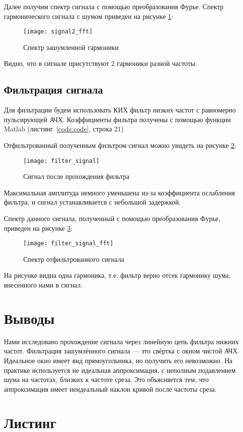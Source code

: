 Далее получим спектр сигнала с помощью преобразования Фурье. Спектр гармонического сигнала с шумом приведен на рисунке \ref{pic:signal2_fft}:
\begin{figure}[H]
	\begin{center}
		\texttt{[image: signal2\_fft]}
		\caption{Спектр зашумленной гармоники} 
		\label{pic:signal2_fft} %
	\end{center}
\end{figure}
Видно, что в сигнале присутствуют 2 гармоники разной частоты.

\subsection{Фильтрация сигнала}

Для фильтрации будем использовать КИХ фильтр низких частот с равномерно пульсирующей АЧХ. 
Коэффициенты фильтра получены с помощью функции Matlab (листинг~\ref{code:code}, строка 21)

Отфильтрованный полученным фильтром сигнал можно увидеть на рисунке \ref{pic:filter_signal}:
\begin{figure}[H]
	\begin{center}
		\texttt{[image: filter\_signal]}
		\caption{Сигнал после прохождения фильтра} 
		\label{pic:filter_signal} %
	\end{center}
\end{figure}
Максимальная амплитуда немного уменьшена из-за коэффициента ослабления фильтра, и сигнал устанавливается с небольшой задержкой.

Спектр данного сигнала, полученный с помощью преобразования Фурье, приведен на рисунке \ref{pic:filter_signal_fft}:
\begin{figure}[H]
	\begin{center}
		\texttt{[image: filter\_signal\_fft]}
		\caption{Спектр отфильтрованного сигнала} 
		\label{pic:filter_signal_fft} %
	\end{center}
\end{figure}
На рисунке видна одна гармоника, т.е. фильтр верно отсек гармонику шума, внесенного нами в сигнал.

\section{Выводы}

Нами исследовано прохождение сигнала через линейную цепь фильтра нижних частот.
Фильтрация зашумлённого сигнала --- это свёртка с окном чистой АЧХ.
Идеальное окно имеет вид прямоугольника, но получить его невозможно. 
На практике используется не идеальная аппроксимация, с неполным подавлением 
шума на частотах, близких к частоте среза. 
Это объясняется тем, что аппроксимация имеет неидеальный наклон кривой после частоты среза.

\section{Листинг}

\parindent=1cm

